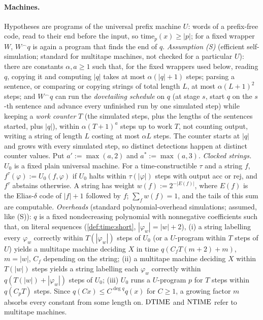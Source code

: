 \paragraph{Machines.} Hypotheses are programs of the universal prefix machine $U$: words of a prefix-free code, read to their end before the input, so $\mathrm{time}_p(x)\ge|p|$; for a fixed wrapper $W$, $W^\frown q$ is again a program that finds the end of $q$. \emph{Assumption (S)} (efficient self-simulation; standard for multitape machines, not checked for a particular $U$): there are constants $\alpha,a\ge1$ such that, for the fixed wrappers used below, reading $q$, copying it and computing $|q|$ takes at most $\alpha(|q|+1)$ steps; parsing a sentence, or comparing or copying strings of total length $L$, at most $\alpha(L+1)^2$ steps; and $W^\frown q$ can run the \emph{dovetailing schedule} on $q$ (at stage $s$, start $q$ on the $s$-th sentence and advance every unfinished run by one simulated step) while keeping a \emph{work counter} $T$ (the simulated steps, plus the lengths of the sentences started, plus $|q|$), within $\alpha(T+1)^a$ steps up to work $T$, not counting output, writing a string of length $L$ costing at most $\alpha L$ steps. The counter starts at $|q|$ and grows with every simulated step, so distinct detections happen at distinct counter values. Put $a':=\max(a,2)$ and $a^*:=\max(a,3)$. \emph{Clocked strings.} $U_0$ is a fixed plain universal machine. For a time-constructible $\tau$ and a string $f$, $f^\tau(\varphi):=U_0(f,\varphi)$ if $U_0$ halts within $\tau(|\varphi|)$ steps with output acc or rej, and $f^\tau$ abstains otherwise. A string has weight $w(f):=2^{-|E(f)|}$, where $E(f)$ is the Elias-$\delta$ code of $|f|+1$ followed by $f$; $\sum_fw(f)=1$, and the tails of this sum are computable. \emph{Overheads} (standard polynomial-overhead simulations; assumed, like (S)): $q$ is a fixed nondecreasing polynomial with nonnegative coefficients such that, on literal sequences (\cref{def:time:short}, $|\varphi_w|=|w|+2$), (i) a string labelling every $\varphi_w$ correctly within $T(|\varphi_w|)$ steps of $U_0$ (or a $U$-program within $T$ steps of $U$) yields a multitape machine deciding $X$ in time $q(C_fT(m+2)+m)$, $m=|w|$, $C_f$ depending on the string; (ii) a multitape machine deciding $X$ within $T(|w|)$ steps yields a string labelling each $\varphi_w$ correctly within $q(T(|w|)+|\varphi_w|)$ steps of $U_0$; (iii) $U_0$ runs a $U$-program $p$ for $T$ steps within $q(C_pT)$ steps. Since $q(Cx)\le C^{\deg q}q(x)$ for $C\ge1$, a growing factor $m$ absorbs every constant from some length on. $\mathrm{DTIME}$ and $\mathrm{NTIME}$ refer to multitape machines.

